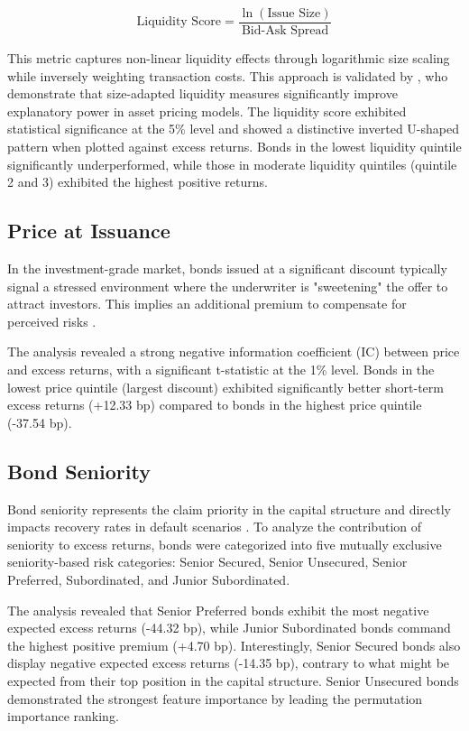 $$\text{Liquidity Score} = \frac{\ln(\text{Issue Size})}{\text{Bid-Ask Spread}}$$

This metric captures non-linear liquidity effects through logarithmic size scaling while inversely weighting transaction costs. This approach is validated by \textcite{Reichenbacher2018Size-AdaptedImplications}, who demonstrate that size-adapted liquidity measures significantly improve explanatory power in asset pricing models. The liquidity score exhibited statistical significance at the 5\% level and showed a distinctive inverted U-shaped pattern when plotted against excess returns. Bonds in the lowest liquidity quintile significantly underperformed, while those in moderate liquidity quintiles (quintile 2 and 3) exhibited the highest positive returns.

\subsection{Price at Issuance}
In the investment-grade market, bonds issued at a significant discount typically signal a stressed environment where the underwriter is "sweetening" the offer to attract investors. This implies an additional premium to compensate for perceived risks \parencite{Geerts2022PredictingYield}.

The analysis revealed a strong negative information coefficient (IC) between price and excess returns, with a significant t-statistic at the 1\% level. Bonds in the lowest price quintile (largest discount) exhibited significantly better short-term excess returns (+12.33 bp) compared to bonds in the highest price quintile (-37.54 bp).

\subsection{Bond Seniority}
Bond seniority represents the claim priority in the capital structure and directly impacts recovery rates in default scenarios \parencite[pp. 682 - 683]{Fabozzi2021TheEdition}. To analyze the contribution of seniority to excess returns, bonds were categorized into five mutually exclusive seniority-based risk categories: Senior Secured, Senior Unsecured, Senior Preferred, Subordinated, and Junior Subordinated.

The analysis revealed that Senior Preferred bonds exhibit the most negative expected excess returns (-44.32 bp), while Junior Subordinated bonds command the highest positive premium (+4.70 bp). Interestingly, Senior Secured bonds also display negative expected excess returns (-14.35 bp), contrary to what might be expected from their top position in the capital structure. Senior Unsecured bonds demonstrated the strongest feature importance by leading the permutation importance ranking.

